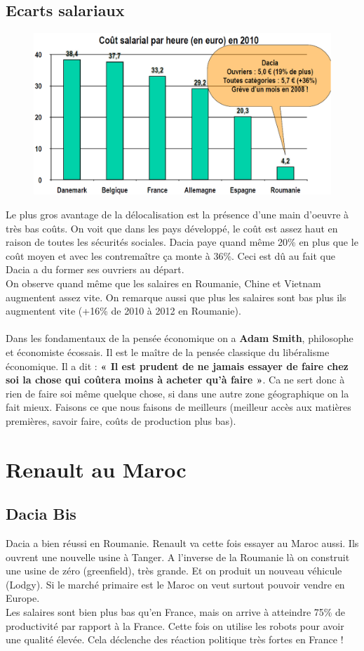 \subsection{Ecarts salariaux}
\begin{figure}
	\includegraphics[scale=0.3]{58}
\end{figure}
Le plus gros avantage de la délocalisation est la présence d'une main d'oeuvre à très bas coûts. On voit que dans les pays développé, le coût est assez haut en raison de toutes les sécurités sociales. Dacia paye quand même 20\% en plus que le coût moyen et avec les contremaître ça monte à 36\%. Ceci est dû au fait que Dacia a du former ses ouvriers au départ. 
\\
On observe quand même que les salaires en Roumanie, Chine et Vietnam augmentent assez vite. On remarque aussi que plus les salaires sont bas plus ils augmentent vite (+16\% de 2010 à 2012 en Roumanie).
\\\\
Dans les fondamentaux de la pensée économique on a \textbf{Adam Smith}, philosophe et économiste écossais. Il est le maître de la pensée classique du libéralisme économique. Il a dit : \textbf{« Il est prudent de ne jamais essayer de faire chez soi la
chose qui coûtera moins à acheter qu’à faire »}. Ca ne sert donc à rien de faire soi même quelque chose, si dans une autre zone géographique on la fait mieux. Faisons ce que nous faisons de meilleurs (meilleur accès aux matières premières, savoir faire, coûts de production plus bas).

\section{Renault au Maroc}
\subsection{Dacia Bis}
Dacia a bien réussi en Roumanie. Renault va cette fois essayer au Maroc aussi. Ils ouvrent une nouvelle usine à Tanger. A l'inverse de la Roumanie là on construit une usine de zéro (greenfield), très grande. Et on produit un nouveau véhicule (Lodgy). Si le marché primaire est le Maroc on veut surtout pouvoir vendre en Europe. \\
Les salaires sont bien plus bas qu'en France, mais on arrive à atteindre 75\% de productivité par rapport à la France. Cette fois on utilise les robots pour avoir une qualité élevée. Cela déclenche des réaction politique très fortes en France !

